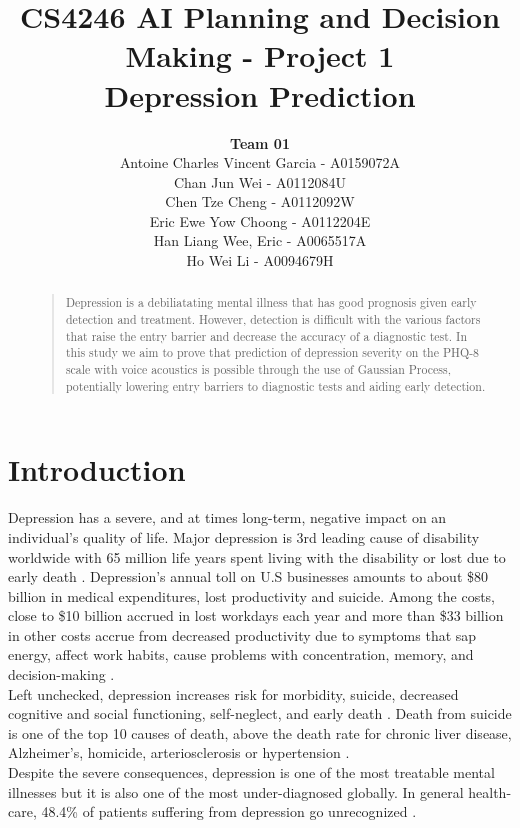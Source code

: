 \documentclass{article}
\title{
	CS4246 AI Planning and Decision Making - Project 1 \\
	Depression Prediction
}
\author{
	{\bf Team 01} \\
	Antoine Charles Vincent Garcia - A0159072A\\
	Chan Jun Wei - A0112084U\\
	Chen Tze Cheng - A0112092W\\
	Eric Ewe Yow Choong - A0112204E\\
	Han Liang Wee, Eric - A0065517A\\
	Ho Wei Li - A0094679H\\
}
\begin{document}
 	\maketitle

	\begin{abstract}
	\begin{quote}
	Depression is a debiliatating mental illness that has good prognosis given early detection and treatment. 
	However, detection is difficult with the various factors that raise the entry barrier and decrease the accuracy of a diagnostic test. 
	In this study we aim to prove that prediction of depression severity on the PHQ-8 scale with voice acoustics is possible through the use of Gaussian Process, potentially lowering entry barriers to diagnostic tests and aiding early detection. \\
	\end{quote}
	\end{abstract}
	
	\section{Introduction}
	Depression has a severe, and at times long-term, negative impact on an individual's quality of life. 
	Major depression is 3rd leading cause of disability worldwide with 65 million life years spent living with the disability or lost due to early death \cite{who2004}.
	Depression's annual toll on U.S businesses amounts to about \$80 billion in medical expenditures, lost productivity and suicide. 
	Among the costs, close to \$10 billion accrued in lost workdays each year and more than \$33 billion in other costs accrue from decreased productivity due to symptoms that sap energy, affect work habits, cause problems with concentration, memory, and decision-making \cite{tjcp2015}. \\

	Left unchecked, depression increases risk for morbidity, suicide, decreased cognitive and social functioning, self-neglect, and early death \cite{arcp2009}. 
	Death from suicide is one of the top 10 causes of death, above the death rate for chronic liver disease, Alzheimer's, homicide, arteriosclerosis or hypertension \cite{nvsr2016}. \\

	Despite the severe consequences, depression is one of the most treatable mental illnesses but it is also one of the most under-diagnosed globally. 
	In general health-care, 48.4\% of patients suffering from depression go unrecognized \cite{jama2003}.
\end{document}
